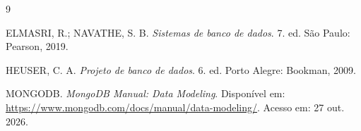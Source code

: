 \needspace{5cm}

\begin{thebibliography}{9}

ELMASRI, R.; NAVATHE, S. B. \emph{Sistemas de banco de dados}. 7. ed. São Paulo: Pearson, 2019.

HEUSER, C. A. \emph{Projeto de banco de dados}. 6. ed. Porto Alegre: Bookman, 2009.

MONGODB. \emph{MongoDB Manual: Data Modeling}. Disponível em: \url{https://www.mongodb.com/docs/manual/data-modeling/}. Acesso em: 27 out. 2026.

\end{thebibliography}
